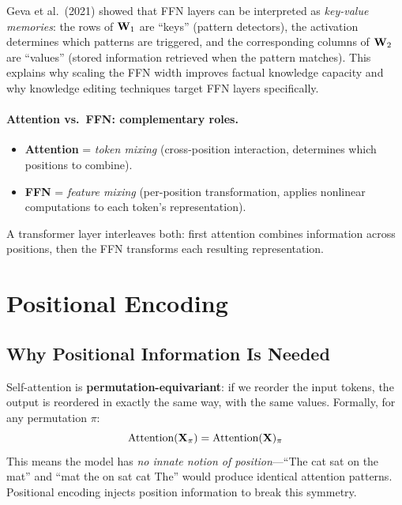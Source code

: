 \begin{keyinsight}
Geva et al.\ (2021) showed that FFN layers can be interpreted as
\emph{key-value memories}: the rows of $\mathbf{W}_1$ are ``keys'' (pattern
detectors), the activation determines which patterns are triggered, and the
corresponding columns of $\mathbf{W}_2$ are ``values'' (stored information retrieved
when the pattern matches).  This explains why scaling the FFN width improves
factual knowledge capacity and why knowledge editing techniques target FFN
layers specifically.
\end{keyinsight}

\paragraph{Attention vs.\ FFN: complementary roles.}
\begin{itemize}
    \item \textbf{Attention} = \emph{token mixing} (cross-position
          interaction, determines which positions to combine).
    \item \textbf{FFN} = \emph{feature mixing} (per-position transformation,
          applies nonlinear computations to each token's representation).
\end{itemize}

A transformer layer interleaves both: first attention combines information
across positions, then the FFN transforms each resulting representation.


\section{Positional Encoding}
\label{sec:positional-encoding}

\subsection{Why Positional Information Is Needed}

Self-attention is \textbf{permutation-equivariant}: if we reorder the input
tokens, the output is reordered in exactly the same way, with the same values.
Formally, for any permutation $\pi$:
\[
    \text{Attention}(\mathbf{X}_\pi) = \text{Attention}(\mathbf{X})_\pi
\]
This means the model has \emph{no innate notion of position}---``The cat sat
on the mat'' and ``mat the on sat cat The'' would produce identical attention
patterns.  Positional encoding injects position information to break this
symmetry.

